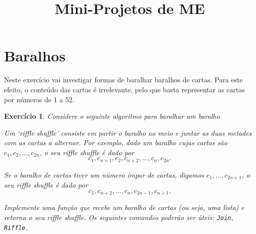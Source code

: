 \documentclass{article}
\title{Mini-Projetos de ME}
\author{}
\date{}
\newtheorem{ex}{Exercício}
\begin{document}
\section{Baralhos}

Neste exercício vai investigar formas de baralhar baralhos de cartas. Para este efeito, o conteúdo das cartas é irrelevante, pelo que basta representar as cartas por números de 1 a 52.

\begin{ex}
Considere o seguinte algoritmo para baralhar um baralho.

Um `riffle shuffle' consiste em partir o baralho ao meio e juntar as duas metades com as cartas a alternar. Por exemplo, dado um baralho cujas cartas são $c_1, c_2, \dots, c_{2n}$, o seu riffle shuffle é dado por
\[c_1, c_{n+1}, c_2, c_{n+2}, \dots, c_n, c_{2n}.\]

Se o baralho de cartas tiver um número ímpar de cartas, digamos $c_1, \dots, c_{2n+1}$, o seu riffle shuffle é dado por
\[c_1, c_{n+2}, \dots, c_n, c_{2n-1}, c_{n+1}.\]

Implemente uma função que recebe um baralho de cartas (ou seja, uma lista) e retorna o seu riffle shuffle. Os seguintes comandos poderão ser úteis: \texttt{Join}, \texttt{Riffle}.
\end{ex}
\end{document}
